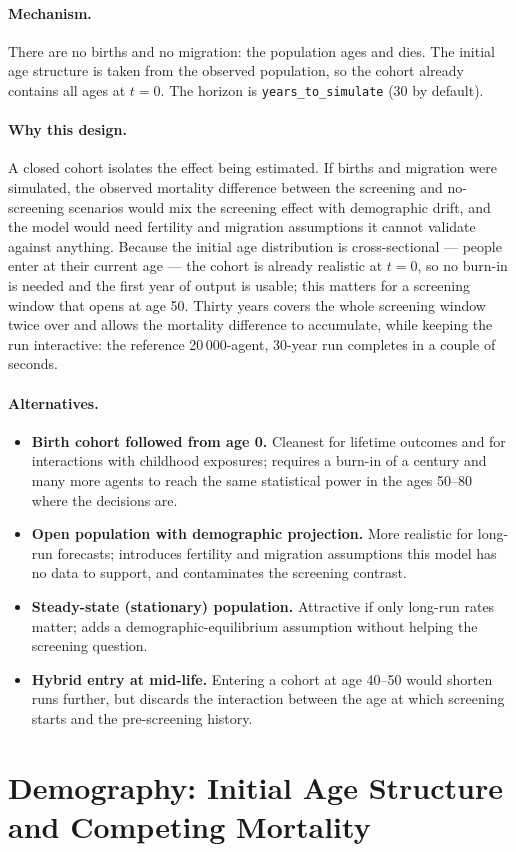 \documentclass[12pt,a4paper]{article}
\newcommand{\id}[1]{\texttt{#1}}
\newcommand{\mech}[1]{\paragraph{Mechanism.} #1}
\newcommand{\why}[1]{\paragraph{Why this design.} #1}
\newcommand{\alt}[1]{\paragraph{Alternatives.} #1}
\begin{document}
\mech{There are no births and no migration: the population ages and dies. The initial age structure is
taken from the observed population, so the cohort already contains all ages at $t=0$. The horizon is
\id{years\_to\_simulate} (30 by default).}

\why{A closed cohort isolates the effect being estimated. If births and migration were simulated, the
observed mortality difference between the screening and no-screening scenarios would mix the screening
effect with demographic drift, and the model would need fertility and migration assumptions it cannot
validate against anything. Because the initial age distribution is cross-sectional --- people enter at
their current age --- the cohort is already realistic at $t=0$, so no burn-in is needed and the first
year of output is usable; this matters for a screening window that opens at age 50. Thirty years covers
the whole screening window twice over and allows the mortality difference to accumulate, while keeping
the run interactive: the reference 20\,000-agent, 30-year run completes in a couple of seconds.}

\alt{\begin{itemize}[nosep]
  \item \textbf{Birth cohort followed from age 0.} Cleanest for lifetime outcomes and for interactions
        with childhood exposures; requires a burn-in of a century and many more agents to reach the same
        statistical power in the ages 50--80 where the decisions are.
  \item \textbf{Open population with demographic projection.} More realistic for long-run forecasts;
        introduces fertility and migration assumptions this model has no data to support, and
        contaminates the screening contrast.
  \item \textbf{Steady-state (stationary) population.} Attractive if only long-run rates matter; adds a
        demographic-equilibrium assumption without helping the screening question.
  \item \textbf{Hybrid entry at mid-life.} Entering a cohort at age 40--50 would shorten runs further, but
        discards the interaction between the age at which screening starts and the pre-screening history.
\end{itemize}}

\section{Demography: Initial Age Structure and Competing Mortality}
\end{document}
